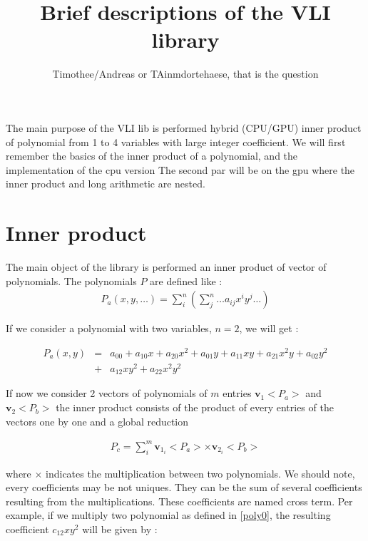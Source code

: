 \documentclass[11pt]{amsart}
\title{Brief descriptions of the VLI library}
\author{Timothee/Andreas or TAinmdortehaese, that is the question}
\begin{document}
\maketitle


The main purpose of the VLI lib is performed hybrid (CPU/GPU) inner product of polynomial from 1 to 4 variables with large integer coefficient. We will first remember the basics of the inner product of a polynomial, 
and the implementation of the cpu version  The second par will be on the gpu where the inner product and long arithmetic are nested.

\section*{Inner product}

The main object of the library is performed an inner product of vector of polynomials. The polynomials $P$ are defined like :
\begin{eqnarray}
P_a(x,y,\dots) = \sum_i^n \left( \sum_j^n \dots a_{ij} x^i y^j \dots \right)
\end{eqnarray}

 If we consider a polynomial with two variables,  $n=2$, we will get :

\begin{eqnarray}
P_a(x,y) &=&   a_{00} + a_{10}x + a_{20}x^2 + a_{01}y + a_{11} xy + a_{21}x^2y +  a_{02}y^2  \\
              &+ & a_{12}xy^2 + a_{22}x^2y^2 \nonumber \label{poly0}
\end{eqnarray}
 
 If now we consider 2 vectors of polynomials of $m$ entries  $\boldsymbol{v}_1<P_a>$ and  $\boldsymbol{v}_2<P_b>$ the inner product  consists of the product 
 of every entries of the vectors one by one and a global reduction 
 
 \begin{eqnarray}
 P_c = \sum_i^m \boldsymbol{v}_{1_i}<P_a>  \times  \boldsymbol{v}_{2_i}<P_b> \label{poly1}
\end{eqnarray}

where $\times$ indicates the multiplication between two polynomials. We should note, every coefficients may be not uniques. They can be the sum of several coefficients resulting from the multiplications.
These coefficients are named cross term. Per example, if we multiply two polynomial as defined in \ref{poly0}, the resulting coefficient $c_{12}xy^2$ will be given by : 
\end{document}
